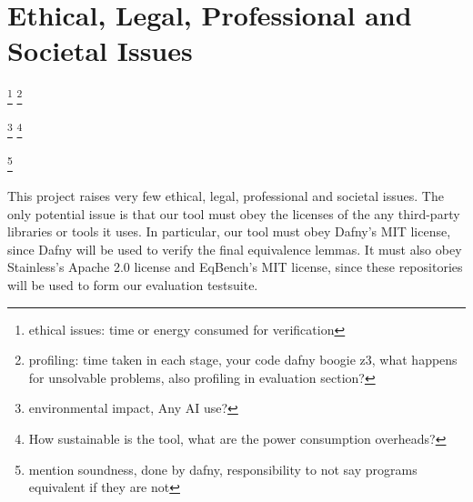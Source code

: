 \chapter{Ethical, Legal, Professional and Societal Issues}

\footnote{ethical issues: time or energy consumed for verification}
\footnote{profiling: time taken in each stage, your code dafny boogie z3, what happens for unsolvable problems, also profiling in evaluation section?}

\footnote{environmental impact, Any AI use?}
\footnote{How sustainable is the tool, what are the power consumption overheads?}

\footnote{mention soundness, done by dafny, responsibility to not say programs equivalent if they are not}

This project raises very few ethical, legal, professional and societal issues. The only potential issue is that our tool must obey the licenses of the any third-party libraries or tools it uses. In particular, our tool must obey Dafny's MIT license, since Dafny will be used to verify the final equivalence lemmas. It must also obey Stainless's Apache 2.0 license\cite{StainlessFrontendsBenchmarks} and EqBench's MIT license\cite{badihiEqBenchDatasetEquivalent2021}, since these repositories will be used to form our evaluation testsuite.